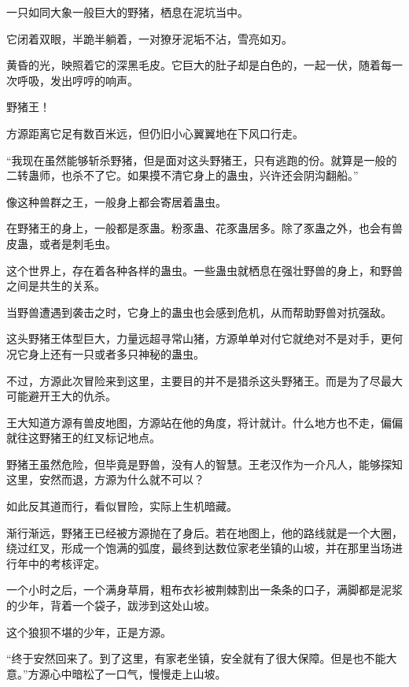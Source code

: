 
\begin{this_body}



一只如同大象一般巨大的野猪，栖息在泥坑当中。

它闭着双眼，半跪半躺着，一对獠牙泥垢不沾，雪亮如刃。

黄昏的光，映照着它的深黑毛皮。它巨大的肚子却是白色的，一起一伏，随着每一次呼吸，发出哼哼的响声。

野猪王！

方源距离它足有数百米远，但仍旧小心翼翼地在下风口行走。

“我现在虽然能够斩杀野猪，但是面对这头野猪王，只有逃跑的份。就算是一般的二转蛊师，也杀不了它。如果摸不清它身上的蛊虫，兴许还会阴沟翻船。”

像这种兽群之王，一般身上都会寄居着蛊虫。

在野猪王的身上，一般都是豕蛊。粉豕蛊、花豕蛊居多。除了豕蛊之外，也会有兽皮蛊，或者是刺毛虫。

这个世界上，存在着各种各样的蛊虫。一些蛊虫就栖息在强壮野兽的身上，和野兽之间是共生的关系。

当野兽遭遇到袭击之时，它身上的蛊虫也会感到危机，从而帮助野兽对抗强敌。

这头野猪王体型巨大，力量远超寻常山猪，方源单单对付它就绝对不是对手，更何况它身上还有一只或者多只神秘的蛊虫。

不过，方源此次冒险来到这里，主要目的并不是猎杀这头野猪王。而是为了尽最大可能避开王大的仇杀。

王大知道方源有兽皮地图，方源站在他的角度，将计就计。什么地方也不走，偏偏就往这野猪王的红叉标记地点。

野猪王虽然危险，但毕竟是野兽，没有人的智慧。王老汉作为一介凡人，能够探知这里，安然而退，方源为什么就不可以？

如此反其道而行，看似冒险，实际上生机暗藏。

渐行渐远，野猪王已经被方源抛在了身后。若在地图上，他的路线就是一个大圈，绕过红叉，形成一个饱满的弧度，最终到达数位家老坐镇的山坡，并在那里当场进行年中的考核评定。

一个小时之后，一个满身草屑，粗布衣衫被荆棘割出一条条的口子，满脚都是泥浆的少年，背着一个袋子，跋涉到这处山坡。

这个狼狈不堪的少年，正是方源。

“终于安然回来了。到了这里，有家老坐镇，安全就有了很大保障。但是也不能大意。”方源心中暗松了一口气，慢慢走上山坡。


\end{this_body}
